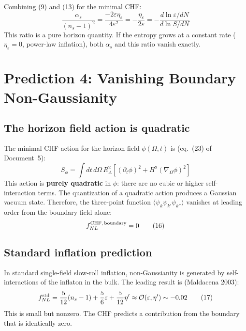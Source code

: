 \documentclass[12pt,a4paper]{article}
\begin{document}
Combining (9) and (13) for the minimal CHF:
\begin{equation}
\frac{\alpha_s}{(n_s - 1)^2} = \frac{-2\varepsilon\eta_\varepsilon}{4\varepsilon^2} = -\frac{\eta_\varepsilon}{2\varepsilon} = -\frac{d\ln\varepsilon/dN}{d\ln S/dN} \tag{14}
\end{equation}
This ratio is a pure horizon quantity. If the entropy grows at a constant rate ($\eta_\varepsilon = 0$, power-law inflation), both $\alpha_s$ and this ratio vanish exactly.

\section{Prediction 4: Vanishing Boundary Non-Gaussianity}

\subsection{The horizon field action is quadratic}

The minimal CHF action for the horizon field $\phi(\Omega, t)$ is (eq.~(23) of Document~5):
\begin{equation}
S_\phi = \int dt\, d\Omega\, R_A^2 \left[(\partial_t\phi)^2 + H^2(\nabla_\Omega\phi)^2\right] \tag{15}
\end{equation}
This action is \textbf{purely quadratic} in $\phi$: there are no cubic or higher self-interaction terms. The quantization of a quadratic action produces a Gaussian vacuum state. Therefore, the three-point function $\langle\psi_k\psi_{k'}\psi_{k''}\rangle$ vanishes at leading order from the boundary field alone:
\begin{equation}
f_{NL}^{\rm CHF,\, boundary} = 0 \tag{16}
\end{equation}

\subsection{Standard inflation prediction}

In standard single-field slow-roll inflation, non-Gaussianity is generated by self-interactions of the inflaton in the bulk. The leading result is (Maldacena 2003):
\begin{equation}
f_{NL}^{\rm std} = \frac{5}{12}(n_s - 1) + \frac{5}{6}\varepsilon + \frac{5}{12}\eta' \approx \mathcal{O}(\varepsilon, \eta') \sim -0.02 \tag{17}
\end{equation}
This is small but nonzero. The CHF predicts a contribution from the boundary that is identically zero.
\end{document}
